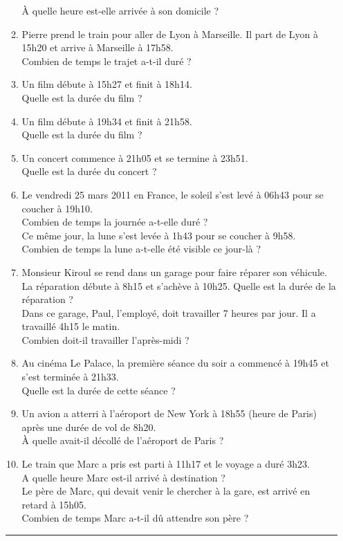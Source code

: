 \documentclass[11pt]{article}
\begin{document}
\begin{multicols}{2}
\begin{enumerate}
\begin{enumerate}
    À quelle heure est-elle arrivée à son domicile ?
  \item Pierre prend le train pour aller de Lyon à Marseille. Il part de Lyon à 15h20 et arrive à Marseille à 17h58. \\
    Combien de temps le trajet a-t-il duré ?
  \item Un film débute à 15h27 et finit à 18h14. \\
    Quelle est la durée du film ? 
  \item Un film débute à 19h34 et finit à 21h58. \\
    Quelle est la durée du film ?
  \item Un concert commence à 21h05 et se termine à 23h51. \\
    Quelle est la durée du concert ?
  \item Le vendredi 25 mars 2011 en France, le soleil s'est levé à 06h43 pour se coucher à 19h10. \\
    Combien de temps la journée a-t-elle duré ?\\
    Ce même jour, la lune s'est levée à 1h43 pour se coucher à 9h58. \\
    Combien de temps la lune a-t-elle été visible ce jour-là ?
  \item Monsieur Kiroul se rend dans un garage pour faire réparer son véhicule.\\
    La réparation débute à 8h15 et s'achève à 10h25. Quelle est la durée de la réparation ?\\
    Dans ce garage, Paul, l'employé, doit travailler 7 heures par jour. Il a travaillé 4h15 le matin. \\
    Combien doit-il travailler l'après-midi ?
  \item Au cinéma Le Palace, la première séance du soir a commencé à 19h45 et s'est terminée à 21h33. \\
    Quelle est la durée de cette séance ?
  \item Un avion a atterri à l'aéroport de New York à 18h55 (heure de Paris) après une durée de vol de 8h20. \\
    À quelle avait-il décollé de l'aéroport de Paris ?
  \item Le train que Marc a pris est parti à 11h17 et le voyage a duré 3h23.\\
    A quelle heure Marc est-il arrivé à destination ?\\
    Le père de Marc, qui devait venir le chercher à la gare, est arrivé en retard à 15h05.\\
    Combien de temps Marc a-t-il dû attendre son père ?
  \end{enumerate}
\rule{\linewidth}{0.5pt}
\end{enumerate}
\end{multicols}
\end{document}
